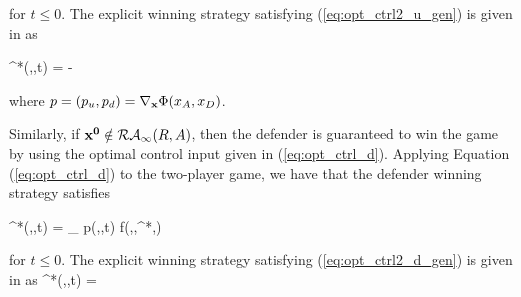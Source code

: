 \noindent for $t\le 0$. The explicit winning strategy satisfying (\ref{eq:opt_ctrl2_u_gen}) is given in \cite{Huang2011} as

\bq \label{eq:opt_ctrl2_a}
\ca^*(\xa,\xb,t) = -\vela {}
\eq

\noindent where $p = (p_u,p_d) = \nabla_{\mathbf{x}} \Phi(x_A,x_D)$.  

Similarly, if $\mathbf{x^0}\notin\mathcal{RA}_\infty(R,A)$, then the defender is guaranteed to win the game by using the optimal control input given in (\ref{eq:opt_ctrl_d}). Applying Equation (\ref{eq:opt_ctrl_d}) to the two-player game, we have that the defender winning strategy satisfies 

\bq \label{eq:opt_ctrl2_d_gen}
  \cb^*(\xa,\xb,t) = \arg \max_{\cb \in {}} p(\xa,\xb,t) \cdot f(\xa,\xb,\ca^*,\cb)
\eq

\noindent for $t\le 0$. The explicit winning strategy satisfying (\ref{eq:opt_ctrl2_d_gen}) is given in \cite{Huang2011} as
\bq \label{eq:opt_ctrl2_d}
\cb^*(\xa,\xb,t) = \velb {}
\eq



